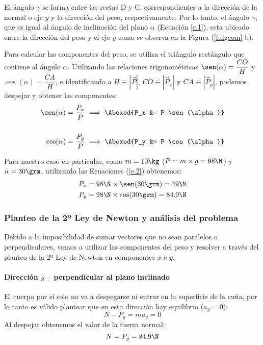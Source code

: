El ángulo $\gamma$ se forma entre las rectas D y C, correspondientes a la
dirección de la normal o eje $y$ y la dirección del peso, respectivamente. Por
lo tanto, el ángulo $\gamma$, que es igual al ángulo de inclinación del plano
$\alpha$ (Ecuación \ref{e.1}), esta ubicado entre la dirección del peso y el eje
$y$ como se observa en la Figura (\ref{f.dgeom}-b).

Para calcular las componentes del peso, se utiliza el triángulo rectángulo que
contiene al ángulo $\alpha$. Utilizando las relaciones trigonométricas
$\sen(\alpha) = \dfrac{CO}{H}$ y $\cos(\alpha)=\dfrac{CA}{H}$, e identificando a
$H\equiv |\vec{P}|$, $CO\equiv |\vec{P}_x|$ y $CA \equiv |\vec{P}_y|$, podemos
despejar y obtener las componentes:
\begin{align} \label{e.2}
  \sen(\alpha) = \dfrac{P_x}{P} \implies \Aboxed{P_x &= P \sen(\alpha)}
  \nonumber \\ \\
  \cos(\alpha) = \dfrac{P_y}{P} \implies \Aboxed{P_y &= P \cos(\alpha)} \nonumber
\end{align}

Para nuestro caso en particular, como $m=10\kg$ ($P=m\times g=98\N$) y
$\alpha=30\grm$, utilizando las Ecuaciones (\ref{e.2}) obtenemos:
\begin{align} \label{e.ps}
  P_x & = 98\N\times \sen(30\grm) = 49\N \\
  P_y & = 98\N\times \cos(30\grm) =84.9\N \nonumber
\end{align}

\subsubsection{Planteo de la 2º Ley de Newton y análisis del problema}

Debido a la imposibilidad de sumar vectores que no sean paralelos o
perpendiculares, vamos a utilizar las componentes del peso y resolver a través
del planteo de la 2º Ley de Newton en componentes $x$ e $y$.

\paragraph{Dirección $y$ -- perpendicular al plano inclinado\\}

El cuerpo por sí solo no va a despegarse ni entrar en la superficie de la cuña,
por lo tanto es válido plantear que en esta dirección hay equilibrio ($a_y=0$):
\begin{equation}
  N - P_y = m a_y = 0
\end{equation}
Al despejar obtenemos el valor de la fuerza normal:
\begin{equation} \label{e.n}
  N = P_y = 84.9\N
\end{equation}

